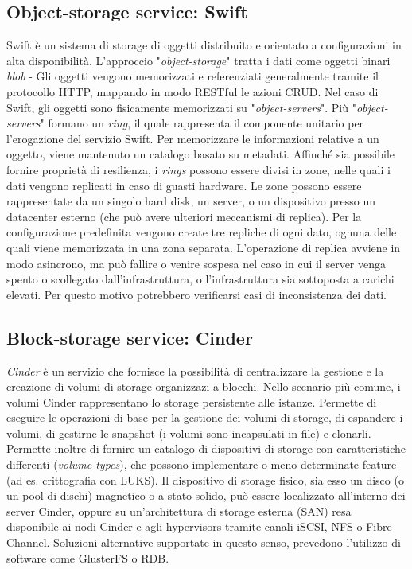 \subsection{Object-storage service: Swift}
Swift è un sistema di storage di oggetti distribuito e orientato a configurazioni in alta disponibilità.
L'approccio "\textit{object-storage}" tratta i dati come oggetti binari \textit{blob} - 
Gli oggetti vengono memorizzati e referenziati generalmente tramite il protocollo HTTP, mappando in modo RESTful le azioni CRUD.
Nel caso di Swift, gli oggetti sono fisicamente memorizzati su "\textit{object-servers}".
Più "\textit{object-servers}" formano un \textit{ring}, il quale rappresenta il componente unitario per l'erogazione del servizio Swift.
Per memorizzare le informazioni relative a un oggetto, viene mantenuto un catalogo basato su metadati.
Affinché sia possibile fornire proprietà di resilienza, i \textit{rings} possono essere divisi in zone, nelle quali i dati vengono replicati in caso di guasti hardware.
Le zone possono essere rappresentate da un singolo hard disk, un server, o un dispositivo presso un datacenter esterno (che può avere ulteriori meccanismi di replica).
Per la configurazione predefinita vengono create tre repliche di ogni dato, ognuna delle quali viene memorizzata in una zona separata.
L'operazione di replica avviene in modo asincrono, ma può fallire o venire sospesa nel caso in cui il server venga spento o scollegato dall'infrastruttura, o l'infrastruttura sia sottoposta a carichi elevati.
Per questo motivo potrebbero verificarsi casi di inconsistenza dei dati.

\subsection{Block-storage service: Cinder}
\textit{Cinder} è un servizio che fornisce la possibilità di centralizzare la gestione e la creazione di volumi di storage organizzazi a blocchi.
Nello scenario più comune, i volumi Cinder rappresentano lo storage persistente alle istanze.
Permette di eseguire le operazioni di base per la gestione dei volumi di storage, di espandere i volumi, di gestirne le snapshot (i volumi sono incapsulati in file) e clonarli.
Permette inoltre di fornire un catalogo di dispositivi di storage con caratteristiche differenti (\textit{volume-types}), che possono implementare o meno determinate feature (ad es. crittografia con LUKS).
Il dispositivo di storage fisico, sia esso un disco (o un pool di dischi) magnetico o a stato solido, può essere localizzato all'interno dei server Cinder, oppure su un'architettura di storage esterna (SAN) resa disponibile ai nodi Cinder e agli hypervisors tramite canali iSCSI, NFS o Fibre Channel.
Soluzioni alternative supportate in questo senso, prevedono l'utilizzo di software come GlusterFS o RDB.

